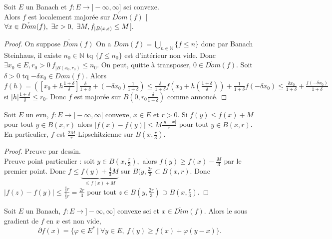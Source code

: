 \begin{lemme}
    Soit $E$ un Banach et $f:E\to ]-\infty ,\infty ]$ sci convexe.\\
    Alors $f$ est localement majorée sur $\mathring{Dom}(f)$ [$\forall x\in \mathring{Dom}(f),\ \exists \varepsilon >0,\ \exists M,\ \\f_{|B(x,\varepsilon )}\le M$].
\end{lemme}
\begin{proof}
    On suppose $\mathring{Dom}(f)$ On a $Dom(f)=\bigcup\limits_{n\in \mathbb{N} } \{f\le n\} $  donc par Banach Steinhaus, il existe $n_0\in \mathbb{N} $ tq $\{f\le n_0\} $ est d'intérieur non vide. Donc $\exists x_0\in E,r_0>0\ f_{|B(x_0,r_0)}\le n_0.$ On peut, quitte à transposer, $0\in \mathring{Dom}(f).$ Soit $\delta>0$ tq $-\delta x_0\in Dom(f).$ Alors $f(h)=\left( \left[ x_0+h \frac{1+\delta}{\delta} \right] \frac{\delta}{1+\delta} +(-\delta x_0) \frac{1}{1+\delta}\right) \le \frac{\delta}{1+\delta}f(x_0+h\left( \frac{1+\delta}{\delta} \right))+\frac{1}{1+\delta}f(-\delta x_0)\le \frac{\delta x_0}{1+\delta}+\frac{f(-\delta x_0)}{1+\delta} $ si $|h|\frac{1+\delta}{\delta}\le r_0. $ Donc $f$ est majorée sur $B(0,r_0 \frac{\delta}{1+\delta})$ comme annoncé.
\end{proof}
\begin{lemme}
    Soit $E$ un evn, $f:E\to ]-\infty ,\infty ]$ convexe, $x\in E$ et $r>0.$ Si $f(y)\le f(x)+M$ pour tout $y\in B(x,r)$ alors $|f(x)-f(y)| \le M \frac{|y-x| }{r}$ pour tout $y\in B(x,r)$.\\
    En particulier, $f$ est $\frac{2M}{r}$-Lipschitzienne sur $B(x,\frac{r}{3}).$
\end{lemme}
\begin{proof}
    Preuve par dessin.\\

Preuve point particulier : soit $y\in B(x,\frac{r}{3}),$ alors $f(y)\ge f(x)-\frac{M}{3}$ par le premier point. Donc $f\le \underbrace{f(y)+\frac{4}{3}M}_{\le f(x)+M}$ sur $B(y,\frac{2r}{3}\subset B(x,r).$ Donc $|f(z)-f(y)| \le \frac{\frac{4}{3}r}{\frac{2}{3}r}=\frac{2r}{3}$ pour tout $z\in B(y,\frac{2r}{3})\supset B(x,\frac{r}{3}).$
\end{proof}
\begin{theoreme}
    Soit $E$ un Banach, $f:E\to ]-\infty ,\infty ]$ convexe sci et $x\in \mathring{Dim}(f).$ Alors le sous gradient de $f$ en $x$ est non vide,
    $$\partial f(x)=\{\varphi \in E^*\ |\ \forall y\in E,\ f(y)\ge f(x)+\varphi (y-x)\} .$$
\end{theoreme}
